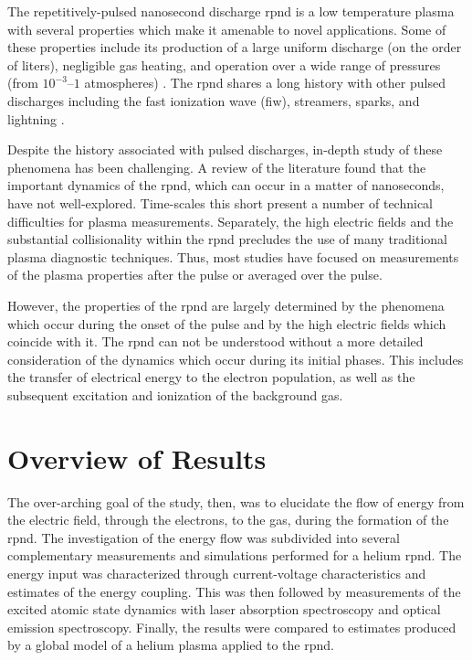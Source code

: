 The repetitively-pulsed nanosecond discharge \acs{rpnd} is a low temperature
plasma with several properties which make it amenable to novel applications.
Some of these properties include its production of a large uniform discharge (on
the order of liters), negligible gas heating, and operation over a wide range of
pressures (from $10^{-3}$--$1$ atmospheres) \cite{Starikovskaia2001}. The
\acs{rpnd} shares a long history with other pulsed discharges including the fast
ionization wave (\acs{fiw}), streamers, sparks, and lightning \cite{Loeb1965}.

Despite the history associated with pulsed discharges, in-depth study of these
phenomena has been challenging. A review of the literature found that the
important dynamics of the \acs{rpnd}, which can occur in a matter of
nanoseconds, have not well-explored. Time-scales this short present a number of
technical difficulties for plasma measurements. Separately, the high electric
fields and the substantial collisionality within the \acs{rpnd} precludes the
use of many traditional plasma diagnostic techniques. Thus, most studies have
focused on measurements of the plasma properties after the pulse or averaged
over the pulse.

However, the properties of the \acs{rpnd} are largely determined by the
phenomena which occur during the onset of the pulse and by the high electric
fields which coincide with it. The \acs{rpnd} can not be understood without a more
detailed consideration of the dynamics which occur during its initial phases.
This includes the transfer of electrical energy to the electron population, as
well as the subsequent excitation and ionization of the background gas.

\section{Overview of Results}

The over-arching goal of the study, then, was to elucidate the flow of energy
from the electric field, through the electrons, to the gas, during the formation
of the \acs{rpnd}. The investigation of the energy flow was subdivided into
several complementary measurements and simulations performed for a helium
\acs{rpnd}. The energy input was characterized through current-voltage
characteristics and estimates of the energy coupling. This was then followed by
measurements of the excited atomic state dynamics with laser absorption
spectroscopy and optical emission spectroscopy. Finally, the results were
compared to estimates produced by a global model of a helium plasma applied to
the \acs{rpnd}.

